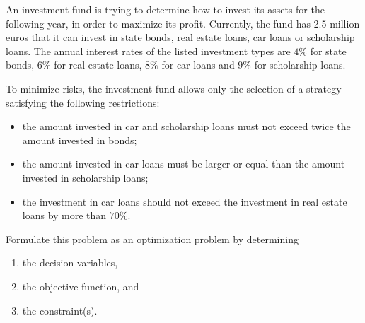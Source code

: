 
An investment fund is trying to determine how to invest its assets for
the following year, in order to maximize its profit. Currently, the
fund has 2.5 million euros that it can invest in state bonds, real
estate loans, car loans or scholarship loans. The annual interest
rates of the listed investment types are $4\%$ for state bonds, $6\%$
for real estate loans, $8\%$ for car loans and $9\%$ for scholarship
loans.

To minimize risks, the investment fund allows only the selection of a strategy satisfying the following restrictions:
\begin{itemize}
	\item the amount invested in car and scholarship  loans must not exceed twice the amount invested in bonds;
	\item the amount invested in car loans must be larger or equal
          than the
          amount invested in  scholarship loans;
	\item the investment in car loans should not exceed the
          investment in real estate loans by more than $70\%$. 
\end{itemize}

Formulate this problem as an optimization problem by determining
\begin{enumerate}
	\item the decision variables,
	\item the objective function, and
	\item the constraint(s).
\end{enumerate}


